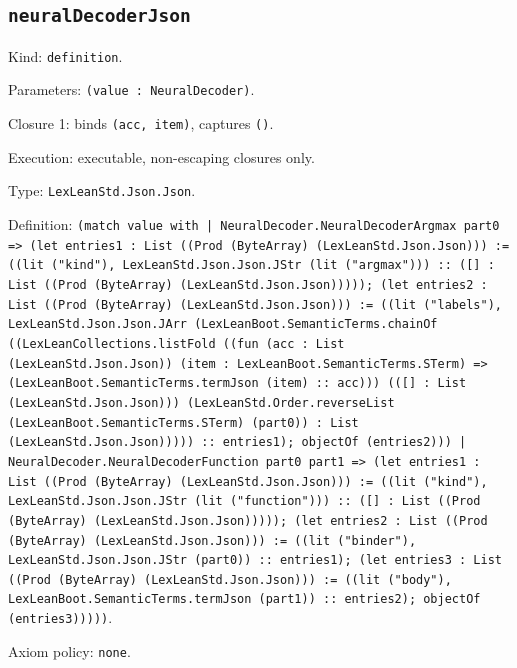 \documentclass[11pt]{article}
\begin{document}
\subsection*{\texttt{neuralDecoderJson}}
\noindent Kind: \texttt{definition}.\par
\noindent Parameters: \texttt{(value : NeuralDecoder)}.\par
\noindent Closure 1: binds \texttt{(acc, item)}, captures \texttt{()}.\par
\noindent Execution: executable, non-escaping closures only.\par
\noindent Type: \texttt{LexLeanStd.Json.Json}.\par
\noindent Definition: \texttt{(match value with | NeuralDecoder.NeuralDecoderArgmax part0 => (let entries1 : List ((Prod (ByteArray) (LexLeanStd.Json.Json))) := ((lit ("kind"), LexLeanStd.Json.Json.JStr (lit ("argmax"))) :: ([] : List ((Prod (ByteArray) (LexLeanStd.Json.Json))))); (let entries2 : List ((Prod (ByteArray) (LexLeanStd.Json.Json))) := ((lit ("labels"), LexLeanStd.Json.Json.JArr (LexLeanBoot.SemanticTerms.chainOf ((LexLeanCollections.listFold ((fun (acc : List (LexLeanStd.Json.Json)) (item : LexLeanBoot.SemanticTerms.STerm) => (LexLeanBoot.SemanticTerms.termJson (item) :: acc))) (([] : List (LexLeanStd.Json.Json))) (LexLeanStd.Order.reverseList (LexLeanBoot.SemanticTerms.STerm) (part0)) : List (LexLeanStd.Json.Json))))) :: entries1); objectOf (entries2))) | NeuralDecoder.NeuralDecoderFunction part0 part1 => (let entries1 : List ((Prod (ByteArray) (LexLeanStd.Json.Json))) := ((lit ("kind"), LexLeanStd.Json.Json.JStr (lit ("function"))) :: ([] : List ((Prod (ByteArray) (LexLeanStd.Json.Json))))); (let entries2 : List ((Prod (ByteArray) (LexLeanStd.Json.Json))) := ((lit ("binder"), LexLeanStd.Json.Json.JStr (part0)) :: entries1); (let entries3 : List ((Prod (ByteArray) (LexLeanStd.Json.Json))) := ((lit ("body"), LexLeanBoot.SemanticTerms.termJson (part1)) :: entries2); objectOf (entries3)))))}.\par
\noindent Axiom policy: \texttt{none}.\par
\end{document}
